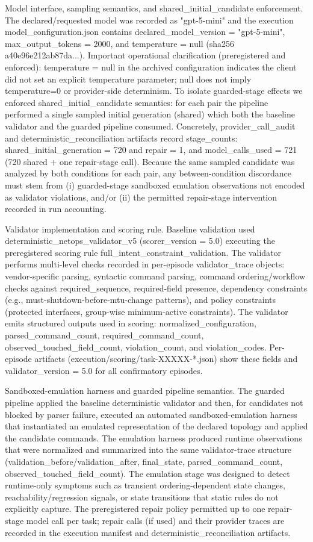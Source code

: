 \documentclass[conference]{IEEEtran}
\begin{document}
Model interface, sampling semantics, and shared\_initial\_candidate enforcement. The declared/requested model was recorded as "gpt-5-mini" and the execution model\_configuration.json contains declared\_model\_version = "gpt-5-mini", max\_output\_tokens = 2000, and temperature = null (sha256 a40e96e212ab87da...). Important operational clarification (preregistered and enforced): temperature = null in the archived configuration indicates the client did not set an explicit temperature parameter; null does not imply temperature=0 or provider-side determinism. To isolate guarded-stage effects we enforced shared\_initial\_candidate semantics: for each pair the pipeline performed a single sampled initial generation (shared) which both the baseline validator and the guarded pipeline consumed. Concretely, provider\_call\_audit and deterministic\_reconciliation artifacts record stage\_counts: shared\_initial\_generation = 720 and repair = 1, and model\_calls\_used = 721 (720 shared + one repair-stage call). Because the same sampled candidate was analyzed by both conditions for each pair, any between-condition discordance must stem from (i) guarded-stage sandboxed emulation observations not encoded as validator violations, and/or (ii) the permitted repair-stage intervention recorded in run accounting.

Validator implementation and scoring rule. Baseline validation used deterministic\_netops\_validator\_v5 (scorer\_version = 5.0) executing the preregistered scoring rule full\_intent\_constraint\_validation. The validator performs multi-level checks recorded in per-episode validator\_trace objects: vendor-specific parsing, syntactic command parsing, command ordering/workflow checks against required\_sequence, required-field presence, dependency constraints (e.g., must-shutdown-before-mtu-change patterns), and policy constraints (protected interfaces, group-wise minimum-active constraints). The validator emits structured outputs used in scoring: normalized\_configuration, parsed\_command\_count, required\_command\_count, observed\_touched\_field\_count, violation\_count, and violation\_codes. Per-episode artifacts (execution/scoring/task-XXXXX-*.json) show these fields and validator\_version = 5.0 for all confirmatory episodes.

Sandboxed-emulation harness and guarded pipeline semantics. The guarded pipeline applied the baseline deterministic validator and then, for candidates not blocked by parser failure, executed an automated sandboxed-emulation harness that instantiated an emulated representation of the declared topology and applied the candidate commands. The emulation harness produced runtime observations that were normalized and summarized into the same validator-trace structure (validation\_before/validation\_after, final\_state, parsed\_command\_count, observed\_touched\_field\_count). The emulation stage was designed to detect runtime-only symptoms such as transient ordering-dependent state changes, reachability/regression signals, or state transitions that static rules do not explicitly capture. The preregistered repair policy permitted up to one repair-stage model call per task; repair calls (if used) and their provider traces are recorded in the execution manifest and deterministic\_reconciliation artifacts.
\end{document}
